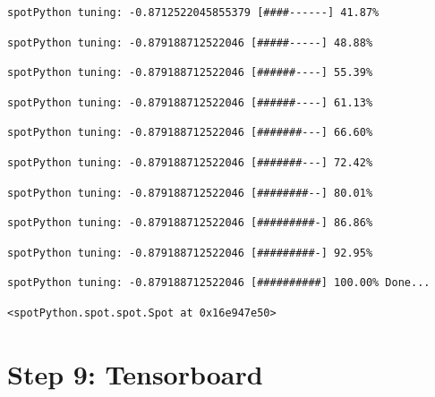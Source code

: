 \documentclass[
  letterpaper,
  DIV=11,
  numbers=noendperiod]{scrreprt}
\begin{document}
\begin{verbatim}
spotPython tuning: -0.8712522045855379 [####------] 41.87% 
\end{verbatim}

\begin{verbatim}
spotPython tuning: -0.879188712522046 [#####-----] 48.88% 
\end{verbatim}

\begin{verbatim}
spotPython tuning: -0.879188712522046 [######----] 55.39% 
\end{verbatim}

\begin{verbatim}
spotPython tuning: -0.879188712522046 [######----] 61.13% 
\end{verbatim}

\begin{verbatim}
spotPython tuning: -0.879188712522046 [#######---] 66.60% 
\end{verbatim}

\begin{verbatim}
spotPython tuning: -0.879188712522046 [#######---] 72.42% 
\end{verbatim}

\begin{verbatim}
spotPython tuning: -0.879188712522046 [########--] 80.01% 
\end{verbatim}

\begin{verbatim}
spotPython tuning: -0.879188712522046 [#########-] 86.86% 
\end{verbatim}

\begin{verbatim}
spotPython tuning: -0.879188712522046 [#########-] 92.95% 
\end{verbatim}

\begin{verbatim}
spotPython tuning: -0.879188712522046 [##########] 100.00% Done...
\end{verbatim}

\begin{verbatim}
<spotPython.spot.spot.Spot at 0x16e947e50>
\end{verbatim}

\hypertarget{sec-tensorboard-16}{%
\section{Step 9: Tensorboard}\label{sec-tensorboard-16}}
\end{document}

